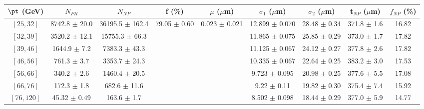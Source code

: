 \begin{tabular}{c||c|c|c|c|c|c|c||c}
$\pt$ (GeV) & $N_{PR}$ & $N_{NP}$ & f (\%) & $\mu$ ($\mu$m) & $\sigma_1$ ($\mu$m) & $\sigma_2$ ($\mu$m)  & t$_{NP}$ ($\mu$m) & $f_{NP}$ (\%) \\
\hline
$[25, 32]$ & 8742.8 $\pm$ 20.0 & 36195.5 $\pm$ 162.4 & \multirow{7}{*}{79.05 $\pm$ 0.60} & \multirow{7}{*}{0.023 $\pm$ 0.021} & 12.899 $\pm$ 0.070 & 28.48 $\pm$ 0.34 & 371.8 $\pm$ 1.6 & 16.82\\
$[32, 39]$ & 3520.2 $\pm$ 12.1 & 15755.3 $\pm$ 66.3 &  &  & 11.865 $\pm$ 0.075 & 25.85 $\pm$ 0.29 & 373.0 $\pm$ 1.7 & 17.82\\
$[39, 46]$ & 1644.9 $\pm$ 7.2 & 7383.3 $\pm$ 43.3 &  &  & 11.125 $\pm$ 0.067 & 24.12 $\pm$ 0.27 & 377.8 $\pm$ 2.6 & 17.82\\
$[46, 56]$ & 761.3 $\pm$ 3.7 & 3353.7 $\pm$ 24.3 &  &  & 10.335 $\pm$ 0.067 & 22.64 $\pm$ 0.25 & 383.2 $\pm$ 3.0 & 17.53\\
$[56, 66]$ & 340.2 $\pm$ 2.6 & 1460.4 $\pm$ 20.5 &  &  & 9.723 $\pm$ 0.095 & 20.98 $\pm$ 0.25 & 377.6 $\pm$ 5.5 & 17.08\\
$[66, 76]$ & 172.3 $\pm$ 1.8 & 682.6 $\pm$ 11.6 &  &  & 9.22 $\pm$ 0.11 & 19.82 $\pm$ 0.30 & 375.4 $\pm$ 7.4 & 15.92\\
$[76, 120]$ & 45.32 $\pm$ 0.49 & 163.6 $\pm$ 1.7 &  &  & 8.502 $\pm$ 0.098 & 18.44 $\pm$ 0.29 & 377.0 $\pm$ 5.9 & 14.77\\
\end{tabular}
